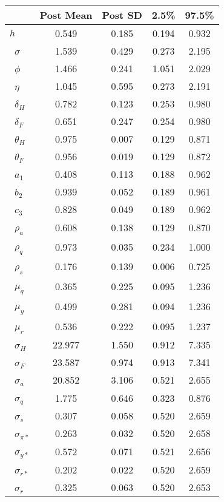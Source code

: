 \begin{tiny}\begin{tabular}{lcccc}
\hline
&\textbf{Post Mean}&\textbf{Post SD}&\textbf{2.5\%}&\textbf{97.5\%}\\\hline
\textbf{$ h             $}&0.549&0.185&0.194&0.932\\\
\textbf{$ \sigma        $}&1.539&0.429&0.273&2.195\\\
\textbf{$ \phi          $}&1.466&0.241&1.051&2.029\\\
\textbf{$ \eta          $}&1.045&0.595&0.273&2.191\\\
\textbf{$ \delta_{H}    $}&0.782&0.123&0.253&0.980\\\
\textbf{$ \delta_{F}    $}&0.651&0.247&0.254&0.980\\\
\textbf{$ \theta_{H}    $}&0.975&0.007&0.129&0.871\\\
\textbf{$ \theta_{F}    $}&0.956&0.019&0.129&0.872\\\
\textbf{$ a_{1}         $}&0.408&0.113&0.188&0.962\\\
\textbf{$ b_{2}         $}&0.939&0.052&0.189&0.961\\\
\textbf{$ c_{3}         $}&0.828&0.049&0.189&0.962\\\
\textbf{$ \rho_{a}      $}&0.608&0.138&0.129&0.870\\\
\textbf{$ \rho_{q}      $}&0.973&0.035&0.234&1.000\\\
\textbf{$ \rho_{s}      $}&0.176&0.139&0.006&0.725\\\
\textbf{$ \mu_{q}       $}&0.365&0.225&0.095&1.236\\\
\textbf{$ \mu_{y}       $}&0.499&0.281&0.094&1.236\\\
\textbf{$ \mu_{r}       $}&0.536&0.222&0.095&1.237\\\
\textbf{$ \sigma_{H}    $}&22.977&1.550&0.912&7.335\\\
\textbf{$ \sigma_{F}    $}&23.587&0.974&0.913&7.341\\\
\textbf{$ \sigma_{a}    $}&20.852&3.106&0.521&2.655\\\
\textbf{$ \sigma_{q}    $}&1.775&0.646&0.323&0.876\\\
\textbf{$ \sigma_{s}    $}&0.307&0.058&0.520&2.659\\\
\textbf{$ \sigma_{\pi*} $}&0.263&0.032&0.520&2.658\\\
\textbf{$ \sigma_{y*}   $}&0.572&0.071&0.521&2.656\\\
\textbf{$ \sigma_{r*}   $}&0.202&0.022&0.520&2.659\\\
\textbf{$ \sigma_{r}    $}&0.325&0.063&0.520&2.653\\\hline
\end{tabular}
\end{tiny}